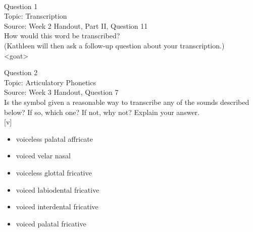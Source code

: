 \documentclass[12pt]{article}
\begin{document}
\begin{center}
\textbf{{\color{red}{\HUGE END OF EXAM}}}\\

\end{center}
\newpage

\begin{center}
\textbf{{\color{blue}{\HUGE START OF EXAM\\}}}

\textbf{{\color{blue}{\HUGE Student ID: 16464\\}}}

\textbf{{\color{blue}{\HUGE \\}}}

\end{center}
\newpage

{\large Question 1}\\

Topic: Transcription\\
Source: Week 2 Handout, Part II, Question 11\\

How would this word be transcribed?\\ (Kathleen will then ask a follow-up question about your transcription.)\\

<goat>


\newpage

{\large Question 2}\\

Topic: Articulatory Phonetics\\
Source: Week 3 Handout, Question 7\\

Is the symbol given a reasonable way to transcribe any of the sounds described below? If so, which one? If not, why not? Explain your answer.\\

{[v]}

\begin{itemize} \item voiceless palatal affricate \item voiced velar nasal \item voiceless glottal fricative \item voiced labiodental fricative \item voiced interdental fricative \item voiced palatal fricative \end{itemize}


\newpage
\end{document}
